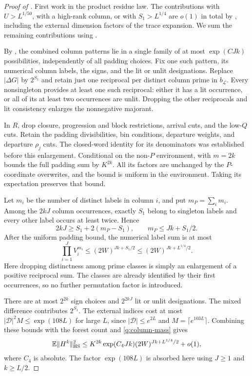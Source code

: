 \begin{proof}[Proof of ]
First work in the product residue law.  The contributions with
$U>L^{1/50}$, with a high-rank column, or with $S_1>L^{1/4}$ are
$o(1)$ in total by , including
the external dimension factors of the trace expansion.  We sum the
remaining contributions using .

By , the combined column patterns lie in a single
family of at most $\exp(CJk)$ possibilities, independently of all
padding choices.  Fix one such pattern, its numerical column labels,
the signs, and the lit or unlit designations.  Replace
$|\Delta G|$ by $2^{S_1}$ and retain just one reciprocal per distinct
column prime in $b_{\mathcal L}$.  Every nonsingleton provides at
least one such reciprocal: either it has a lit occurrence, or all
of its at least two occurrences are unlit.  Dropping the other
reciprocals and lit consistency enlarges the nonnegative majorant.

In $R$, drop closure, progression and block restrictions, arrival
cuts, and the low-$Q$ cuts.  Retain the padding divisibilities, bin
conditions, departure weights, and departure $\rho_j$ cuts.  The
closed-word identity for its denominators was established before
this enlargement.  Conditional on the non-$P$ environment,
 with $m=2k$ bounds the full padding sum by
$K^{2k}$.  All its factors are unchanged by the $P$-coordinate
overwrites, and the bound is uniform in the environment.  Taking
its expectation preserves that bound.

Let $m_i$ be the number of distinct labels in column $i$, and put
$m_P=\sum_i m_i$.  Among the $2kJ$ column occurrences, exactly $S_1$
belong to singleton labels and every other label occurs at least
twice.  Hence
\[
 2kJ\ge S_1+2(m_P-S_1),\qquad
 m_P\le Jk+S_1/2.
\]
After the uniform padding bound, the numerical label sum is at most
\begin{equation}\label{q:column-mass}
 \prod_{i=1}^J V_i^{m_i}
 \le (2W)^{Jk+S_1/2}
 \le (2W)^{Jk+L^{1/4}/2}.
\end{equation}
Here dropping distinctness among prime classes is simply an
enlargement of a positive reciprocal sum.  The classes are already
identified by their first occurrences, so no further permutation
factor is introduced.

There are at most $2^{2k}$ sign choices and $2^{2kJ}$ lit or unlit
designations.  The mixed difference contributes $2^{S_1}$.  The
external indices cost at most $|\mathcal D|^2M\le\exp(108L)$ for
large $L$, since $|\mathcal D|\le e^{2L}$ and
$M=\lceil e^{103L}\rceil$.  Combining these bounds with the forest
count and \eqref{q:column-mass} gives
\begin{equation}\label{q:trace-preconstant}
 \mathbb E\|H^k\|_{\mathrm{HS}}^2
 \le K^{2k}\exp(C_4Jk)(2W)^{Jk+L^{1/4}/2}+o(1),
\end{equation}
where $C_4$ is absolute.  The factor $\exp(108L)$ is absorbed here
using $J\ge1$ and $k\ge L/2$.


\end{proof}
